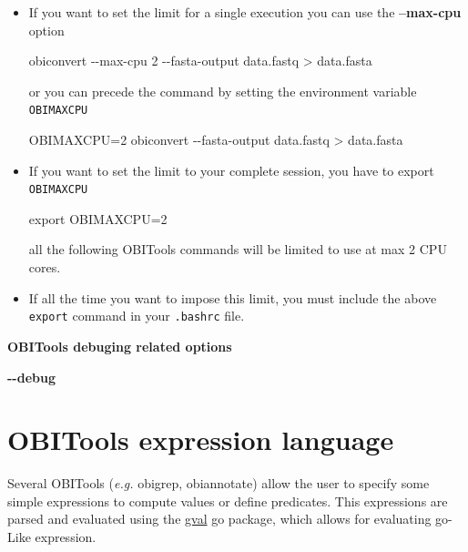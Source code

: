 \documentclass[
  letterpaper,
  DIV=11,
  numbers=noendperiod]{scrreprt}
\newenvironment{Shaded}{\begin{snugshade}}{\end{snugshade}}
\newcommand{\AttributeTok}[1]{\textcolor[rgb]{0.40,0.45,0.13}{#1}}
\newcommand{\BuiltInTok}[1]{\textcolor[rgb]{0.00,0.23,0.31}{#1}}
\newcommand{\ExtensionTok}[1]{\textcolor[rgb]{0.00,0.23,0.31}{#1}}
\newcommand{\NormalTok}[1]{\textcolor[rgb]{0.00,0.23,0.31}{#1}}
\newcommand{\OperatorTok}[1]{\textcolor[rgb]{0.37,0.37,0.37}{#1}}
\newcommand{\VariableTok}[1]{\textcolor[rgb]{0.07,0.07,0.07}{#1}}
\begin{document}
\begin{itemize}
\item
  If you want to set the limit for a single execution you can use the
  \textbf{--max-cpu} option

\begin{Shaded}
\begin{Highlighting}[]
\ExtensionTok{obiconvert} \AttributeTok{{-}{-}max{-}cpu}\NormalTok{ 2 }\AttributeTok{{-}{-}fasta{-}output}\NormalTok{ data.fastq }\OperatorTok{\textgreater{}}\NormalTok{ data.fasta}
\end{Highlighting}
\end{Shaded}

  or you can precede the command by setting the environment variable
  \texttt{OBIMAXCPU}

\begin{Shaded}
\begin{Highlighting}[]
\VariableTok{OBIMAXCPU}\OperatorTok{=}\NormalTok{2 }\ExtensionTok{obiconvert} \AttributeTok{{-}{-}fasta{-}output}\NormalTok{ data.fastq }\OperatorTok{\textgreater{}}\NormalTok{ data.fasta}
\end{Highlighting}
\end{Shaded}
\item
  If you want to set the limit to your complete session, you have to
  export \texttt{OBIMAXCPU}

\begin{Shaded}
\begin{Highlighting}[]
\BuiltInTok{export} \VariableTok{OBIMAXCPU}\OperatorTok{=}\NormalTok{2 }
\end{Highlighting}
\end{Shaded}

  all the following OBITools commands will be limited to use at max 2
  CPU cores.
\item
  If all the time you want to impose this limit, you must include the
  above \texttt{export} command in your \texttt{.bashrc} file.
\end{itemize}

\textbf{OBITools debuging related options}

\textbf{-\/-debug}

\hypertarget{obitools-expression-language}{%
\chapter{OBITools expression
language}\label{obitools-expression-language}}

Several OBITools (\emph{e.g.} obigrep, obiannotate) allow the user to
specify some simple expressions to compute values or define predicates.
This expressions are parsed and evaluated using the
\href{https://pkg.go.dev/github.com/PaesslerAG/gval}{gval} go package,
which allows for evaluating go-Like expression.
\end{document}
